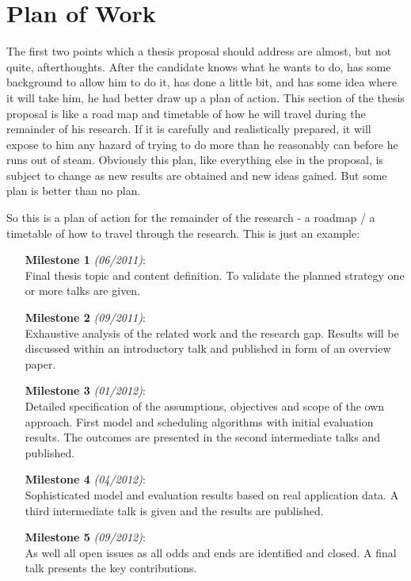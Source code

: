 \section{Plan of Work}\label{sec:actions}
The first two points which a thesis proposal should address are almost, but not quite, afterthoughts. After the candidate knows what he wants to do, has some background to allow him to do it, has done a little bit, and has some idea where it will take him, he had better draw up a plan of action. This section of the thesis proposal is like a road map and timetable of how he will travel during the remainder of his research. If it is carefully and realistically prepared, it will expose to him any hazard of trying to do more than he reasonably can before he runs out of steam. Obviously this plan, like everything else in the proposal, is subject to change as new results are obtained and new ideas gained. But some plan is better than no plan.

So this is a plan of action for the remainder of the research - a roadmap / a timetable of how to travel through the research. This is just an example:

\begin{itemize}
 \item[\textbf{Milestone 1} \textit{(06/2011)}:]~\\
 Final thesis topic and content definition. To validate the planned strategy one or more talks are given.
 \item[\textbf{Milestone 2} \textit{(09/2011)}:]~\\
 Exhaustive analysis of the related work and the research gap. Results will be discussed within an introductory talk and published in form of an overview paper.
 \item[\textbf{Milestone 3} \textit{(01/2012)}:]~\\
 Detailed specification of the assumptions, objectives and scope of the own approach. First model and scheduling algorithms with initial evaluation results. The outcomes are presented in the second intermediate talks and published.
 \item[\textbf{Milestone 4} \textit{(04/2012)}:]~\\
 Sophisticated model and evaluation results based on real application data. A third intermediate talk is given and the results are published.
 \item[\textbf{Milestone 5} \textit{(09/2012)}:]~\\
 As well all open issues as all odds and ends are identified and closed. A final talk presents the key contributions.
\end{itemize}
